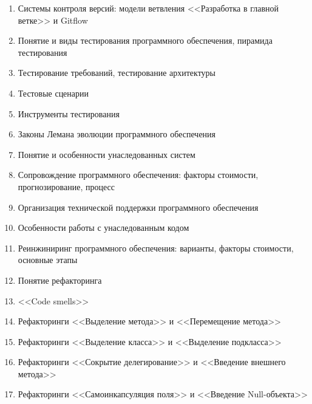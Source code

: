 \documentclass[a5paper]{article}
\begin{document}
\begin{enumerate}
    \item Системы контроля версий: модели ветвления <<Разработка в главной ветке>> и Gitflow
    \item Понятие и виды тестирования программного обеспечения, пирамида тестирования
    \item Тестирование требований, тестирование архитектуры
    \item Тестовые сценарии
    \item Инструменты тестирования
    \item Законы Лемана эволюции программного обеспечения
    \item Понятие и особенности унаследованных систем
    \item Сопровождение программного обеспечения: факторы стоимости, прогнозирование, процесс
    \item Организация технической поддержки программного обеспечения
    \item Особенности работы с унаследованным кодом
    \item Реинжиниринг программного обеспечения: варианты, факторы стоимости, основные этапы
    \item Понятие рефакторинга
    \item <<Code smells>>
    \item Рефакторинги <<Выделение метода>> и <<Перемещение метода>>
    \item Рефакторинги <<Выделение класса>> и <<Выделение подкласса>>
    \item Рефакторинги <<Сокрытие делегирование>> и <<Введение внешнего метода>>
    \item Рефакторинги <<Самоинкапсуляция поля>> и <<Введение Null-объекта>>

\end{enumerate}
\end{document}
